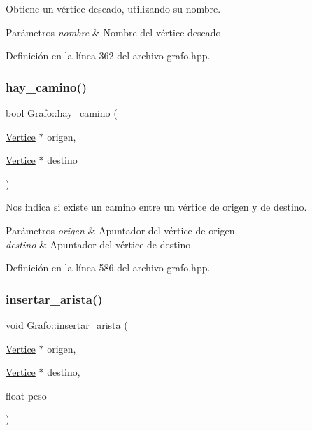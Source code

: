 Obtiene un vértice deseado, utilizando su nombre. 


\begin{DoxyParams}{Parámetros}
{\em nombre} & Nombre del vértice deseado \\
\hline
\end{DoxyParams}


Definición en la línea 362 del archivo grafo.\+hpp.

\mbox{\label{classGrafo_a24cc1dad8b719978e5fcba8b0950c3f5}} 
\subsubsection{\texorpdfstring{hay\+\_\+camino()}{hay\_camino()}}
{\footnotesize\ttfamily bool Grafo\+::hay\+\_\+camino (\begin{DoxyParamCaption}\item[{\hyperlink{classVertice}{Vertice} $\ast$}]{origen,  }\item[{\hyperlink{classVertice}{Vertice} $\ast$}]{destino }\end{DoxyParamCaption})}



Nos indica si existe un camino entre un vértice de origen y de destino. 


\begin{DoxyParams}{Parámetros}
{\em origen} & Apuntador del vértice de origen \\
\hline
{\em destino} & Apuntador del vértice de destino \\
\hline
\end{DoxyParams}


Definición en la línea 586 del archivo grafo.\+hpp.

\mbox{\label{classGrafo_ae49d7c6c60a6b5bb1a7e66ef72144d36}} 
\subsubsection{\texorpdfstring{insertar\+\_\+arista()}{insertar\_arista()}}
{\footnotesize\ttfamily void Grafo\+::insertar\+\_\+arista (\begin{DoxyParamCaption}\item[{\hyperlink{classVertice}{Vertice} $\ast$}]{origen,  }\item[{\hyperlink{classVertice}{Vertice} $\ast$}]{destino,  }\item[{float}]{peso }\end{DoxyParamCaption})}



